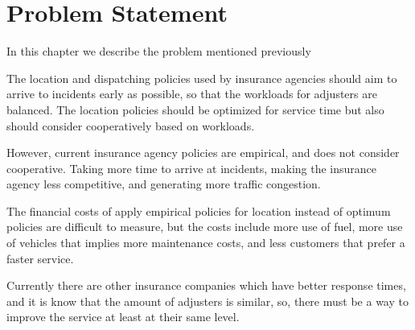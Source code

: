 \chapter{Problem Statement}
In this chapter we describe the problem
mentioned previously

The location and dispatching policies
used by insurance agencies
should aim
to arrive to incidents
early as possible,
so that
the workloads for adjusters are balanced.
The location policies
should be optimized for service time
but also should consider
cooperatively
based on workloads.

However,
current insurance agency policies
are empirical,
and does not consider cooperative.
Taking more time to arrive at incidents,
making the insurance agency
less competitive,
and generating more traffic congestion.

The financial costs
of apply
empirical policies for location
instead of optimum policies
are difficult to measure,
but the costs include
more use of fuel,
more use of vehicles
that implies
more maintenance costs,
and less customers
that prefer a faster service.

Currently
there are other
insurance companies
which have
better response times,
and
it is know
that the amount of adjusters
is similar,
so,
there must be
a way to improve the service
at least at their same level.

